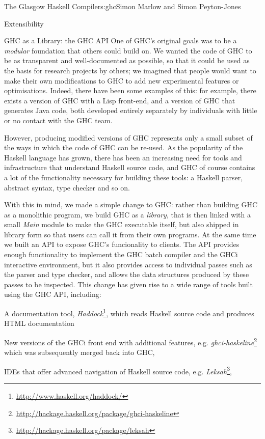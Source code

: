 \begin{aosachapter}{The Glasgow Haskell Compiler}{s:ghc}{Simon Marlow and Simon Peyton-Jones}
\begin{aosasect1}{Extensibility}
\begin{aosasect2}{GHC as a Library: the GHC API}
One of GHC's original goals was to be a \emph{modular} foundation that
others could build on.  We wanted the code of GHC to be as transparent
and well-documented as possible, so that it could be used as the basis
for research projects by others; we imagined that people would want to
make their own modifications to GHC to add new experimental features
or optimisations.  Indeed, there have been some examples of this: for
example, there exists a version of GHC with a Lisp front-end, and a
version of GHC that generates Java code, both developed entirely
separately by individuals with little or no contact with the GHC team.

However, producing modified versions of GHC represents only a small
subset of the ways in which the code of GHC can be re-used.  As the
popularity of the Haskell language has grown, there has been an
increasing need for tools and infrastructure that understand Haskell
source code, and GHC of course contains a lot of the functionality
necessary for building these tools: a Haskell parser, abstract syntax,
type checker and so on.

With this in mind, we made a simple change to GHC: rather than
building GHC as a monolithic program, we build GHC as a
\emph{library}, that is then linked with a small \emph{Main} module to
make the GHC executable itself, but also shipped in library form so
that users can call it from their own programs.  At the same time we
built an API to expose GHC's funcionality to clients.  The API
provides enough functionality to implement the GHC batch compiler and
the GHCi interactive environment, but it also provides access to
individual passes such as the parser and type checker, and allows the
data structures produced by these passes to be inspected.  This change
has given rise to a wide range of tools built using the GHC API,
including:

\begin{aosaitemize}

\item A documentation tool,
  \emph{Haddock}\footnote{\url{http://www.haskell.org/haddock/}},
  which reads Haskell source code and produces HTML documentation

\item New versions of the GHCi front end with additional features,
  e.g. \emph{ghci-haskeline}\footnote{\url{http://hackage.haskell.org/package/ghci-haskeline}}
  which was subsequently merged back into GHC,

\item IDEs that offer advanced navigation of Haskell source code,
  e.g. \emph{Leksah}\footnote{\url{http://hackage.haskell.org/package/leksah}},


\end{aosaitemize}
\end{aosasect2}
\end{aosasect1}
\end{aosachapter}
